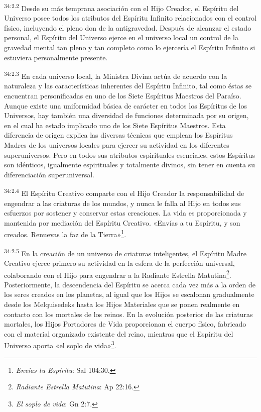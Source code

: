 \par
\textsuperscript{34:2.2} Desde su más temprana asociación con el Hijo Creador, el Espíritu del Universo posee todos los atributos del Espíritu Infinito relacionados con el control físico, incluyendo el pleno don de la antigravedad. Después de alcanzar el estado personal, el Espíritu del Universo ejerce en el universo local un control de la gravedad mental tan pleno y tan completo como lo ejercería el Espíritu Infinito si estuviera personalmente presente.

\par
\textsuperscript{34:2.3} En cada universo local, la Ministra Divina actúa de acuerdo con la naturaleza y las características inherentes del Espíritu Infinito, tal como éstas se encuentran personificadas en uno de los Siete Espíritus Maestros del Paraíso. Aunque existe una uniformidad básica de carácter en todos los Espíritus de los Universos, hay también una diversidad de funciones determinada por su origen, en el cual ha estado implicado uno de los Siete Espíritus Maestros. Esta diferencia de origen explica las diversas técnicas que emplean los Espíritus Madres de los universos locales para ejercer su actividad en los diferentes superuniversos. Pero en todos sus atributos espirituales esenciales, estos Espíritus son idénticos, igualmente espirituales y totalmente divinos, sin tener en cuenta su diferenciación superuniversal.

\par
\textsuperscript{34:2.4} El Espíritu Creativo comparte con el Hijo Creador la responsabilidad de engendrar a las criaturas de los mundos, y nunca le falla al Hijo en todos sus esfuerzos por sostener y conservar estas creaciones. La vida es proporcionada y mantenida por mediación del Espíritu Creativo. «Envías a tu Espíritu, y son creados. Renuevas la faz de la Tierra»\footnote{\textit{Envías tu Espíritu}: Sal 104:30.}.

\par
\textsuperscript{34:2.5} En la creación de un universo de criaturas inteligentes, el Espíritu Madre Creativo ejerce primero su actividad en la esfera de la perfección universal, colaborando con el Hijo para engendrar a la Radiante Estrella Matutina\footnote{\textit{Radiante Estrella Matutina}: Ap 22:16.}. Posteriormente, la descendencia del Espíritu se acerca cada vez más a la orden de los seres creados en los planetas, al igual que los Hijos se escalonan gradualmente desde los Melquisedeks hasta los Hijos Materiales que se ponen realmente en contacto con los mortales de los reinos. En la evolución posterior de las criaturas mortales, los Hijos Portadores de Vida proporcionan el cuerpo físico, fabricado con el material organizado existente del reino, mientras que el Espíritu del Universo aporta «el soplo de vida»\footnote{\textit{El soplo de vida}: Gn 2:7.}.

